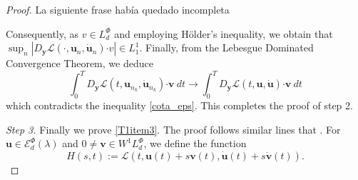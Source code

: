 \documentclass[twoside]{article}
\theoremstyle{remark}
\newcommand{\lphi}{L^{\Phi}}
\newcommand{\wphi}{W^{1}\lphi}
\newcommand{\domi}{\mathcal{E}^{\Phi}_d(\lambda)}
\renewcommand{\b}[1]{\boldsymbol{#1}}
\newcommand{\ccdot}{\b{\cdot}}
\begin{document}
\begin{proof}
{\color{red} La siguiente frase hab\'ia quedado incompleta}

Consequently, as $v \in \lphi_d$ and employing H\"older's inequality, we obtain that 
 $\sup_n|D_{\b{y}}\mathcal{L}(\cdot,\b{u}_n,\b{\dot{u}}_n)\ccdot v| \in L^1_1$.  Finally, from the Lebesgue Dominated Convergence Theorem, we deduce
\begin{equation}\label{conv_debil}\int_0^T  D_{\b{y}}\mathcal{L}(t,\b{u}_{n_k},\b{\dot{u}}_{n_k})\ccdot\b{ v} \ dt \to \int_0^T D_{\b{y}}\mathcal{L}(t,\b{u},\b{\dot{u}})\ccdot\b{ v}\ dt \end{equation}
which contradicts the inequality \eqref{cota_eps}. This completes the proof of step 2.

\emph{Step 3.} Finally we prove \ref{T1item3}. The proof follows similar lines that \cite[Thm. 1.4]{mawhin2010critical}. For $\b{u}\in \domi$ and $0\neq\b{v}\in\wphi_d$, we define the function
\[H(s,t):=\mathcal{L}(t,\b{u}(t)+s\b{v}(t),\b{\dot{u}}(t)+s\b{\dot{v}}(t)).\]


\end{proof}
\end{document}
